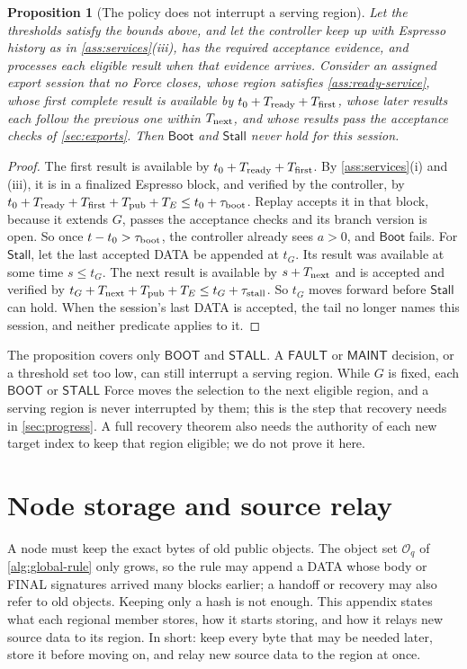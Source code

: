 \documentclass[11pt,a4paper]{article}
\newcommand{\tagg}[1]{\ensuremath{\mathsf{#1}}}
\newtheorem{proposition}[proposition]{Proposition}
\begin{document}
\begin{proposition}[The policy does not interrupt a serving region]
\label{prop:policy-noninterference}
Let the thresholds satisfy the bounds above, and let the controller keep
up with Espresso history as in \cref{ass:services}(iii), has the
required acceptance evidence, and processes each eligible result when
that evidence arrives. Consider an assigned export session that no
Force closes, whose region satisfies
\cref{ass:ready-service}, whose first complete result is available by
$t_0+T_{\rm ready}+T_{\rm first}$, whose later results each follow the
previous one within $T_{\rm next}$, and whose results pass the
acceptance checks of \cref{sec:exports}. Then $\tagg{Boot}$ and
$\tagg{Stall}$ never hold for this session.
\end{proposition}
\begin{proof}
The first result is available by $t_0+T_{\rm ready}+T_{\rm first}$. By
\cref{ass:services}(i) and (iii), it is in a finalized Espresso block,
and verified by the controller, by
$t_0+T_{\rm ready}+T_{\rm first}+T_{\rm pub}+T_E\le
t_0+\tau_{\rm boot}$. Replay accepts it in that block, because
it extends $G$, passes the acceptance checks and its branch version is
open. So once $t-t_0>\tau_{\rm boot}$, the controller already
sees $a>0$, and $\tagg{Boot}$ fails. For $\tagg{Stall}$, let the last
accepted DATA be appended at $t_G$. Its result was available at some
time $s\le t_G$. The next result is available by $s+T_{\rm next}$ and is
accepted and verified by $t_G+T_{\rm next}+T_{\rm pub}+T_E\le
t_G+\tau_{\rm stall}$. So $t_G$ moves forward before $\tagg{Stall}$ can
hold. When the session's last DATA is accepted, the tail no longer names
this session, and neither predicate applies to it.
\end{proof}

The proposition covers only \tagg{BOOT} and \tagg{STALL}. A \tagg{FAULT}
or \tagg{MAINT} decision, or a threshold set too low, can still
interrupt a serving region. While $G$ is fixed, each \tagg{BOOT} or
\tagg{STALL} Force moves the selection to the next eligible region, and
a serving region is never interrupted by them; this is the step that
recovery needs in \cref{sec:progress}. A full recovery theorem also needs
the authority of each new target index to keep that region eligible; we
do not prove it here.

\section{Node storage and source relay}
\label{app:storage}
\label{sec:source-step}
\label{sec:source-retention}
A node must keep the exact bytes of old public objects. The object set
$\mathcal O_q$ of \cref{alg:global-rule} only grows, so the rule may
append a DATA whose body or FINAL signatures arrived many blocks
earlier; a handoff or recovery may also refer to old objects. Keeping
only a hash is not enough. This appendix states what each regional
member stores, how it starts storing, and how it relays new source data
to its region. In short: keep every byte that may be needed later, store
it before moving on, and relay new source data to the region at once.
\end{document}
